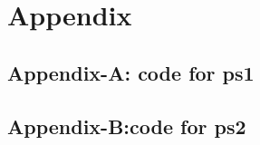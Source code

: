 \documentclass[a4paper,12pt]{article}
\begin{document}

	
	
	
	\newpage
	\section{Appendix}
	\subsection{Appendix-A: code for ps1}
	
	\newpage
	\subsection{Appendix-B:code for ps2}
	
	\newpage
	

	\nocite{*}
	
	
\end{document}
